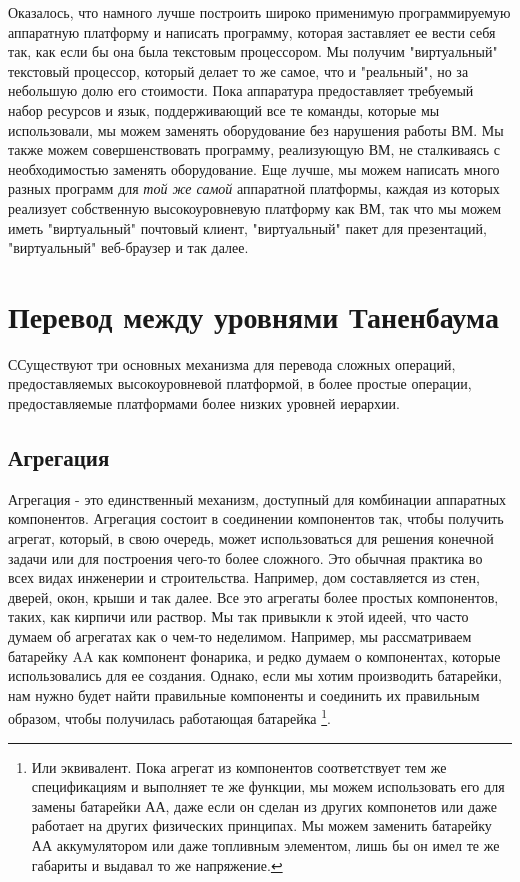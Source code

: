 Оказалось, что намного лучше построить широко применимую программируемую аппаратную платформу и написать программу, которая заставляет ее вести себя так, как если бы она была текстовым процессором. Мы получим "виртуальный" текстовый процессор, который делает то же самое, что и "реальный", но за небольшую долю его стоимости.  Пока аппаратура предоставляет требуемый набор ресурсов и язык, поддерживающий все те команды, которые мы использовали, мы можем заменять оборудование без нарушения работы ВМ.  Мы также можем совершенствовать программу, реализующую ВМ, не сталкиваясь с необходимостью заменять оборудование.  Еще лучше, мы можем написать много разных программ для \emph{той же самой} аппаратной платформы, каждая из которых реализует собственную высокоуровневую платформу как ВМ, так что мы можем иметь "виртуальный" почтовый клиент, "виртуальный" пакет для презентаций, "виртуальный" веб-браузер и так далее.

\section{Перевод между уровнями Таненбаума}

ССуществуют три основных механизма для перевода сложных операций, предоставляемых высокоуровневой платформой, в более простые операции, предоставляемые платформами более низких уровней иерархии.

\subsection{Агрегация}

Агрегация - это единственный механизм, доступный для комбинации аппаратных компонентов.  Агрегация состоит в соединении компонентов так, чтобы получить агрегат, который, в свою очередь, может использоваться для решения конечной задачи или для построения чего-то более сложного.  Это обычная практика во всех видах инженерии и строительства.  Например, дом составляется из стен, дверей, окон, крыши и так далее. Все это агрегаты более простых компонентов, таких, как кирпичи или раствор.  Мы так привыкли к этой идеей, что часто думаем об агрегатах как о чем-то неделимом.  Например, мы рассматриваем батарейку AA как компонент фонарика, и редко думаем о компонентах, которые использовались для ее создания. Однако, если мы хотим производить батарейки, нам нужно будет найти правильные компоненты и соединить их правильным образом, чтобы получилась работающая батарейка
\footnote{Или эквивалент.  Пока агрегат из компонентов соответствует тем же спецификациям и выполняет те же функции, мы можем использовать его для замены батарейки АА, даже если он сделан из других компонетов или даже работает на других физических принципах.  Мы можем заменить батарейку АА аккумулятором или даже топливным элементом, лишь бы он имел те же габариты и выдавал то же напряжение.}.

